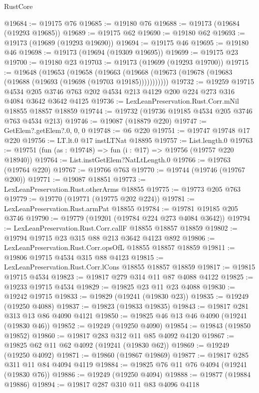 \begin{lexlean}{RustCore}
\begin{coremodule}
@19684 := @19175 @76
@19685 := @19180 @76
@19688 := @19173 (@19684 (@19293 @19685))
@19689 := @19175 @62
@19690 := @19180 @62
@19693 := @19173 (@19689 (@19293 @19690))
@19694 := @19175 @46
@19695 := @19180 @46
@19698 := @19173 (@19694 (@19309 @19695))
@19699 := @19175 @23
@19700 := @19180 @23
@19703 := @19173 (@19699 (@19293 @19700))
@19715 := @19648
    (@19653
      (@19658
        (@19663 (@19668 (@19673 (@19678 (@19683 (@19688 (@19693 (@19698 (@19703 @19185)))))))))))
@19732 := @19259
    @19715
    @4534
    @205
    @3746
    @763
    @202
    @4534
    @213
    @4129
    @200
    @224
    @273
    @316
    @4084
    @3642
    @3642
    @4125
@19736 := LexLeanPreservation.Rust.Corr.mNil @18855 @18857 @18859
@19744 := @19732 (@19736 @19185 @4534 @205 @3746 @763 @4534 @213)
@19746 := @19087 (@18879 @220)
@19747 := GetElem?.getElem?.{0, 0, 0}
@19748 := @6 @220
@19751 := @19747 @19748 @17 @220
@19756 := LT.lt.{0} @17 instLTNat @18895
@19757 := List.length.{0}
@19763 := @19751 (fun (as : @19748) => fun (i : @17) => @19756 (@19757 @220 @18940))
@19764 := List.instGetElem?NatLtLength.{0}
@19766 := @19763 (@19764 @220)
@19767 := @19766 @763
@19770 := @19744 (@19746 (@19767 @200))
@19771 := @19087 @18851
@19773 := LexLeanPreservation.Rust.otherArms @18855
@19775 := @19773 @205 @763
@19779 := @19770 (@19771 (@19775 @202 @224))
@19781 := LexLeanPreservation.Rust.armPat @18855
@19784 := @19781 @19185 @205 @3746
@19790 := @19779 (@19201 (@19784 @224 @273 @4084 @3642))
@19794 := LexLeanPreservation.Rust.Corr.callF @18855 @18857 @18859
@19802 := @19794 @19715 @23 @315 @88 @213 @3642 @4123 @892
@19806 := LexLeanPreservation.Rust.Corr.opsOfL @18855 @18857 @18859
@19811 := @19806 @19715 @4534 @315 @88 @4123
@19815 := LexLeanPreservation.Rust.Corr.lCons @18855 @18857 @18859
@19817 := @19815 @19715 @4534
@19823 := @19817 @279 @314 @11 @87 @4088 @4122
@19825 := @19233 @19715 @4534
@19829 := @19825 @23 @11 @23 @4088
@19830 := @19242 @19715
@19833 := @19829 (@19241 (@19830 @23))
@19835 := @19249 (@19250 @4088)
@19837 := @19823 (@19833 @19835)
@19843 := @19817 @281 @313 @13 @86 @4090 @4121
@19850 := @19825 @46 @13 @46 @4090 (@19241 (@19830 @46))
@19852 := @19249 (@19250 @4090)
@19854 := @19843 (@19850 @19852)
@19860 := @19817 @283 @312 @11 @85 @4092 @4120
@19867 := @19825 @62 @11 @62 @4092 (@19241 (@19830 @62))
@19869 := @19249 (@19250 @4092)
@19871 := @19860 (@19867 @19869)
@19877 := @19817 @285 @311 @11 @84 @4094 @4119
@19884 := @19825 @76 @11 @76 @4094 (@19241 (@19830 @76))
@19886 := @19249 (@19250 @4094)
@19888 := @19877 (@19884 @19886)
@19894 := @19817 @287 @310 @11 @83 @4096 @4118

\end{coremodule}
\end{lexlean}
